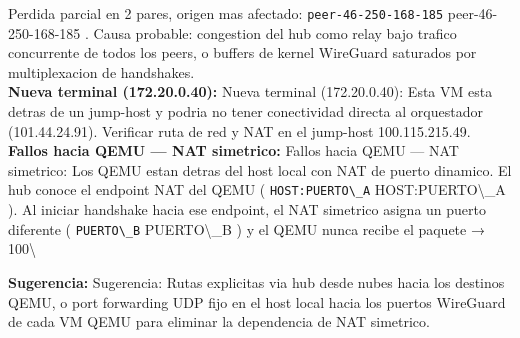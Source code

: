 \documentclass[11pt,a4paper]{article}
\begin{document}
Perdida parcial en 2 pares, origen mas afectado:  \texttt{peer-46-250-168-185} peer-46-250-168-185 . Causa probable: congestion del hub como relay bajo trafico concurrente de todos los peers, o buffers de kernel WireGuard saturados por multiplexacion de handshakes.\\

\textbf{Nueva terminal (172.20.0.40):} Nueva terminal (172.20.0.40):  Esta VM esta detras de un jump-host y podria no tener conectividad directa al orquestador (101.44.24.91). Verificar ruta de red y NAT en el jump-host 100.115.215.49.\\

\textbf{Fallos hacia QEMU — NAT simetrico:} Fallos hacia QEMU — NAT simetrico:  Los QEMU estan detras del host local con NAT de puerto dinamico. El hub conoce el endpoint NAT del QEMU ( \texttt{HOST:PUERTO\textbackslash{}_A} HOST:PUERTO\textbackslash{}_A ). Al iniciar handshake hacia ese endpoint, el NAT simetrico asigna un puerto diferente ( \texttt{PUERTO\textbackslash{}_B} PUERTO\textbackslash{}_B ) y el QEMU nunca recibe el paquete → 100\textbackslash{}%

\textbf{Sugerencia:} Sugerencia:  Rutas explicitas via hub desde nubes hacia los destinos QEMU, o port forwarding UDP fijo en el host local hacia los puertos WireGuard de cada VM QEMU para eliminar la dependencia de NAT simetrico.\\
\end{document}
